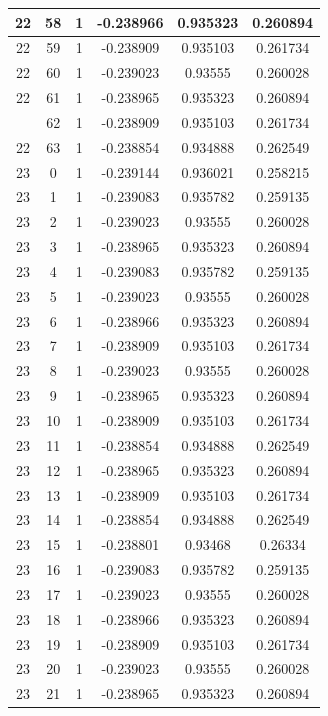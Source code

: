 \documentclass[12pt,a4paper]{article}
\numberwithin{equation}{section}
\numberwithin{figure}{section}
\numberwithin{table}{section}
\begin{document}
\begin{longtable}{|c|c|c|c|c|c|}
22 & 58 & 1 & -0.238966 & 0.935323 & 0.260894 \\ \hline
22 & 59 & 1 & -0.238909 & 0.935103 & 0.261734 \\ \hline
22 & 60 & 1 & -0.239023 & 0.93555 & 0.260028 \\ \hline
22 & 61 & 1 & -0.238965 & 0.935323 & 0.260894 \\ \hline
\pagebreak
22 & 62 & 1 & -0.238909 & 0.935103 & 0.261734 \\ \hline
22 & 63 & 1 & -0.238854 & 0.934888 & 0.262549 \\ \hline
23 & 0 & 1 & -0.239144 & 0.936021 & 0.258215 \\ \hline
23 & 1 & 1 & -0.239083 & 0.935782 & 0.259135 \\ \hline
23 & 2 & 1 & -0.239023 & 0.93555 & 0.260028 \\ \hline
23 & 3 & 1 & -0.238965 & 0.935323 & 0.260894 \\ \hline
23 & 4 & 1 & -0.239083 & 0.935782 & 0.259135 \\ \hline
23 & 5 & 1 & -0.239023 & 0.93555 & 0.260028 \\ \hline
23 & 6 & 1 & -0.238966 & 0.935323 & 0.260894 \\ \hline
23 & 7 & 1 & -0.238909 & 0.935103 & 0.261734 \\ \hline
23 & 8 & 1 & -0.239023 & 0.93555 & 0.260028 \\ \hline
23 & 9 & 1 & -0.238965 & 0.935323 & 0.260894 \\ \hline
23 & 10 & 1 & -0.238909 & 0.935103 & 0.261734 \\ \hline
23 & 11 & 1 & -0.238854 & 0.934888 & 0.262549 \\ \hline
23 & 12 & 1 & -0.238965 & 0.935323 & 0.260894 \\ \hline
23 & 13 & 1 & -0.238909 & 0.935103 & 0.261734 \\ \hline
23 & 14 & 1 & -0.238854 & 0.934888 & 0.262549 \\ \hline
23 & 15 & 1 & -0.238801 & 0.93468 & 0.26334 \\ \hline
23 & 16 & 1 & -0.239083 & 0.935782 & 0.259135 \\ \hline
23 & 17 & 1 & -0.239023 & 0.93555 & 0.260028 \\ \hline
23 & 18 & 1 & -0.238966 & 0.935323 & 0.260894 \\ \hline
23 & 19 & 1 & -0.238909 & 0.935103 & 0.261734 \\ \hline
23 & 20 & 1 & -0.239023 & 0.93555 & 0.260028 \\ \hline
23 & 21 & 1 & -0.238965 & 0.935323 & 0.260894 \\ \hline

\end{longtable}
\end{document}

